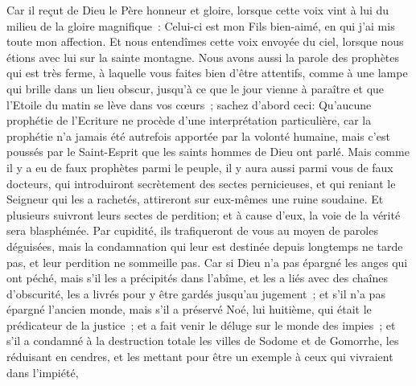 \begin{multicols}{2}
Car il reçut de Dieu le Père honneur et gloire, lorsque cette voix vint à lui du milieu de la gloire magnifique~: Celui-ci est mon Fils bien-aimé, en qui j'ai mis toute mon affection.
Et nous entendîmes cette voix envoyée du ciel, lorsque nous étions avec lui sur la sainte montagne.
Nous avons aussi la parole des prophètes qui est très ferme, à laquelle vous faites bien d'être attentifs, comme à une lampe qui brille dans un lieu obscur, jusqu'à ce que le jour vienne à paraître et que l'Etoile du matin se lève dans vos cœurs~;
sachez d'abord ceci: Qu'aucune prophétie de l'Ecriture ne procède d'une interprétation particulière,
car la prophétie n'a jamais été autrefois apportée par la volonté humaine, mais c'est poussés par le Saint-Esprit que les saints hommes de Dieu ont parlé. 
\VerseOne{}Mais comme il y a eu de faux prophètes parmi le peuple, il y aura aussi parmi vous de faux docteurs, qui introduiront secrètement des sectes pernicieuses, et qui reniant le Seigneur qui les a rachetés, attireront sur eux-mêmes une ruine soudaine. 
Et plusieurs suivront leurs sectes de perdition; et à cause d'eux, la voie de la vérité sera blasphémée.
Par cupidité, ils trafiqueront de vous au moyen de paroles déguisées, mais la condamnation qui leur est destinée depuis longtemps ne tarde pas, et leur perdition ne sommeille pas.
Car si Dieu n'a pas épargné les anges qui ont péché, mais s'il les a précipités dans l'abîme, et les a liés avec des chaînes d'obscurité, les a livrés pour y être gardés jusqu'au jugement~;
et s'il n'a pas épargné l'ancien monde, mais s'il a préservé Noé, lui huitième, qui était le prédicateur de la justice~; et a fait venir le déluge sur le monde des impies~;
et s'il a condamné à la destruction totale les villes de Sodome et de Gomorrhe, les réduisant en cendres, et les mettant pour être un exemple à ceux qui vivraient dans l'impiété,

\end{multicols}
